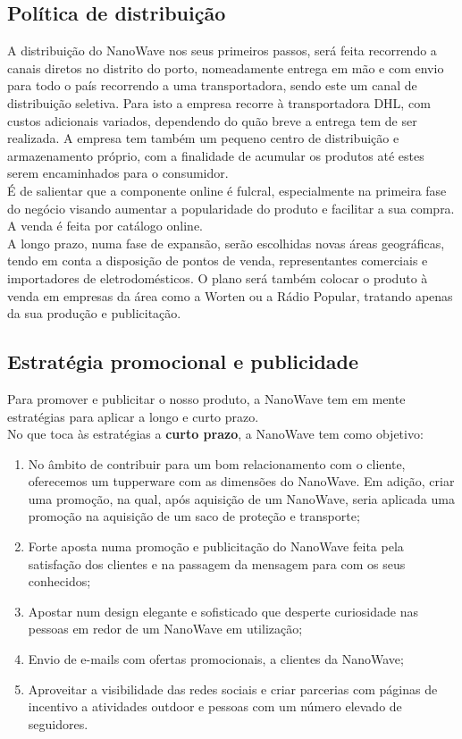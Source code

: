 \documentclass[a4paper]{article}
\begin{document}
\subsection{Política de distribuição}
A distribuição do NanoWave nos seus primeiros passos, será feita recorrendo a canais diretos no distrito do porto, nomeadamente entrega em mão e com envio para todo o país recorrendo a uma transportadora, sendo este um canal de distribuição seletiva. Para isto a empresa recorre à transportadora DHL, com custos adicionais variados, dependendo do quão breve a entrega tem de ser realizada. A empresa tem também um pequeno centro de distribuição e armazenamento próprio, com a finalidade de acumular os produtos até estes serem encaminhados para o consumidor.\\
É de salientar que a componente online é fulcral, especialmente na primeira fase do negócio visando aumentar a popularidade do produto e facilitar a sua compra. A venda é feita por catálogo online.\\
A longo prazo, numa fase de expansão, serão escolhidas novas áreas geográficas, tendo em conta a disposição de pontos de venda, representantes comerciais e importadores de eletrodomésticos. O plano será também colocar o produto à venda em empresas da área como a Worten ou a Rádio Popular, tratando apenas da sua produção e publicitação.

\subsection{Estratégia promocional e publicidade}
Para promover e publicitar o nosso produto, a NanoWave tem em mente estratégias para aplicar a longo e curto prazo.\\
No que toca às estratégias a \textbf{curto prazo}, a NanoWave tem como objetivo:
\begin{enumerate}
    \item No âmbito de contribuir para um bom relacionamento com o cliente, oferecemos um tupperware com as dimensões do NanoWave. Em adição, criar uma promoção, na qual, após aquisição de um NanoWave, seria aplicada uma promoção na aquisição de um saco de proteção e transporte;
    \item Forte aposta numa promoção e publicitação do NanoWave feita pela satisfação dos clientes e na passagem da mensagem para com os seus conhecidos;
    \item Apostar num design elegante e sofisticado que desperte curiosidade nas pessoas em redor de um NanoWave em utilização;
    \item Envio de e-mails com ofertas promocionais, a clientes da NanoWave;
    \item Aproveitar a visibilidade das redes sociais e criar parcerias com páginas de incentivo a atividades outdoor e pessoas com um número elevado de seguidores.
\end{enumerate}
\end{document}
